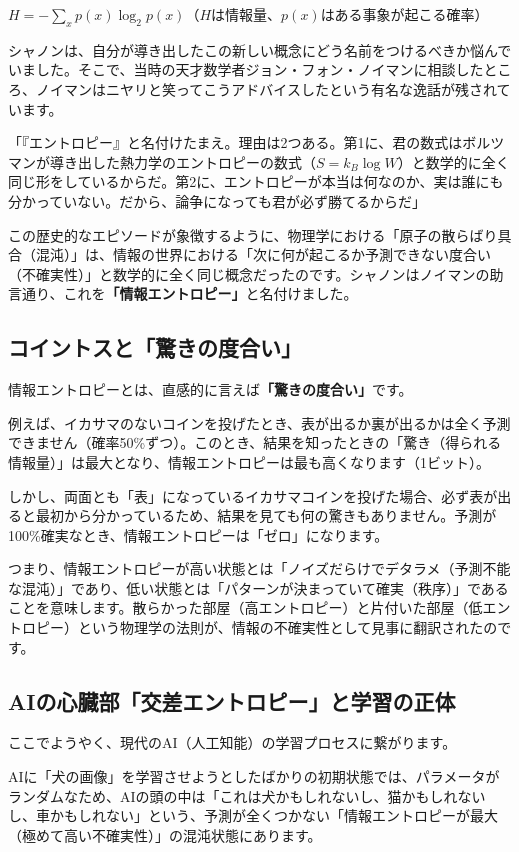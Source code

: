 \(H=-\sum_x p(x)\log_2 p(x)\)（\(H\)は情報量、\(p(x)\)はある事象が起こる確率）

シャノンは、自分が導き出したこの新しい概念にどう名前をつけるべきか悩んでいました。そこで、当時の天才数学者ジョン・フォン・ノイマンに相談したところ、ノイマンはニヤリと笑ってこうアドバイスしたという有名な逸話が残されています。

「『エントロピー』と名付けたまえ。理由は2つある。第1に、君の数式はボルツマンが導き出した熱力学のエントロピーの数式（\(S=k_B\log W\)）と数学的に全く同じ形をしているからだ。第2に、エントロピーが本当は何なのか、実は誰にも分かっていない。だから、論争になっても君が必ず勝てるからだ」

この歴史的なエピソードが象徴するように、物理学における「原子の散らばり具合（混沌）」は、情報の世界における「次に何が起こるか予測できない度合い（不確実性）」と数学的に全く同じ概念だったのです。シャノンはノイマンの助言通り、これを\textbf{「情報エントロピー」}と名付けました。

\subsection{コイントスと「驚きの度合い」}

情報エントロピーとは、直感的に言えば\textbf{「驚きの度合い」}です。

例えば、イカサマのないコインを投げたとき、表が出るか裏が出るかは全く予測できません（確率50\%ずつ）。このとき、結果を知ったときの「驚き（得られる情報量）」は最大となり、情報エントロピーは最も高くなります（1ビット）。

しかし、両面とも「表」になっているイカサマコインを投げた場合、必ず表が出ると最初から分かっているため、結果を見ても何の驚きもありません。予測が100\%確実なとき、情報エントロピーは「ゼロ」になります。

つまり、情報エントロピーが高い状態とは「ノイズだらけでデタラメ（予測不能な混沌）」であり、低い状態とは「パターンが決まっていて確実（秩序）」であることを意味します。散らかった部屋（高エントロピー）と片付いた部屋（低エントロピー）という物理学の法則が、情報の不確実性として見事に翻訳されたのです。

\subsection{AIの心臓部「交差エントロピー」と学習の正体}

ここでようやく、現代のAI（人工知能）の学習プロセスに繋がります。

AIに「犬の画像」を学習させようとしたばかりの初期状態では、パラメータがランダムなため、AIの頭の中は「これは犬かもしれないし、猫かもしれないし、車かもしれない」という、予測が全くつかない「情報エントロピーが最大（極めて高い不確実性）」の混沌状態にあります。

